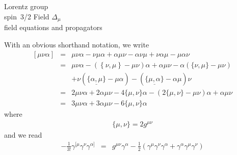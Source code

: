 Lorentz group\\
spin~3/2 Field $\Delta_\mu$\\
field equations and propagators

\bigskip

With an obvious shorthand notation, we write
\begin{eqnarray}
\left[
\mu \nu \alpha
\right]
&=&
\mu \nu \alpha - \nu \mu \alpha
+
\alpha \mu \nu - \alpha \nu \mu
+
\nu \alpha \mu - \mu \alpha \nu
\nonumber\\
&=&
\mu \nu \alpha - ( \left\{ \nu, \mu \right\} - \mu \nu ) \alpha
+
\alpha \mu \nu - \alpha (\{\nu, \mu \}- \mu \nu)
\nonumber\\
&&
+
\nu (\underline{\{ \alpha, \mu \}} - \mu \alpha ) - (\underline{\{ \mu, \alpha \}} - \alpha \mu) \nu
\nonumber\\
&=&
2 \mu \nu \alpha + 2 \alpha \mu \nu - 4 \{ \mu, \nu\} \alpha
- (2\{ \mu, \nu\} - \mu \nu) \alpha + \alpha \mu \nu
\nonumber\\
&=&
3 \mu \nu \alpha + 3 \alpha \mu \nu - 6 \{\mu, \nu \} \alpha
\end{eqnarray}
where
\begin{eqnarray}
\{\mu, \nu \} = 2 g^{\mu \nu}
\end{eqnarray}
and we read
\begin{eqnarray}
- \frac{1}{3!} \gamma^{[\mu} \gamma^\nu \gamma^{\alpha]}
&=&
g^{\mu \nu} \gamma^\alpha
-
\frac{1}{2}
\left(
\gamma^\mu \gamma^\nu \gamma^\alpha
+
\gamma^\alpha \gamma^\mu \gamma^\nu 
\right)
\end{eqnarray}
